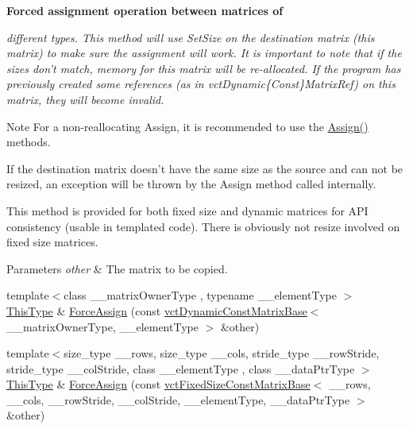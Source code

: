 \begin{Indent}{\bf Forced assignment operation between matrices of}\par
{\em different types. This method will use Set\-Size on the destination matrix (this matrix) to make sure the assignment will work. It is important to note that if the sizes don't match, memory for this matrix will be re-\/allocated. If the program has previously created some references (as in vct\-Dynamic\{Const\}Matrix\-Ref) on this matrix, they will become invalid.

\begin{DoxyNote}{Note}
For a non-\/reallocating Assign, it is recommended to use the \hyperlink{classvct_dynamic_matrix_base_a2f080a67dc52e906f0219bbc924febbc}{Assign()} methods.

If the destination matrix doesn't have the same size as the source and can not be resized, an exception will be thrown by the Assign method called internally.

This method is provided for both fixed size and dynamic matrices for A\-P\-I consistency (usable in templated code). There is obviously not resize involved on fixed size matrices.
\end{DoxyNote}

\begin{DoxyParams}{Parameters}
{\em other} & The matrix to be copied. \\
\hline
\end{DoxyParams}
}\begin{DoxyCompactItemize}
\item 
{\footnotesize template$<$class \-\_\-\-\_\-matrix\-Owner\-Type , typename \-\_\-\-\_\-element\-Type $>$ }\\\hyperlink{classvct_dynamic_const_matrix_base_ac4ff48cbe4d9de3fdef5a02447ffb9db}{This\-Type} \& \hyperlink{classvct_dynamic_matrix_base_ab29e3da9a500707dc89a48f1b85d8aec}{Force\-Assign} (const \hyperlink{classvct_dynamic_const_matrix_base}{vct\-Dynamic\-Const\-Matrix\-Base}$<$ \-\_\-\-\_\-matrix\-Owner\-Type, \-\_\-\-\_\-element\-Type $>$ \&other)
\item 
{\footnotesize template$<$size\-\_\-type \-\_\-\-\_\-rows, size\-\_\-type \-\_\-\-\_\-cols, stride\-\_\-type \-\_\-\-\_\-row\-Stride, stride\-\_\-type \-\_\-\-\_\-col\-Stride, class \-\_\-\-\_\-element\-Type , class \-\_\-\-\_\-data\-Ptr\-Type $>$ }\\\hyperlink{classvct_dynamic_const_matrix_base_ac4ff48cbe4d9de3fdef5a02447ffb9db}{This\-Type} \& \hyperlink{classvct_dynamic_matrix_base_aed7c5ada42a3f300ca14684df76cb6fc}{Force\-Assign} (const \hyperlink{classvct_fixed_size_const_matrix_base}{vct\-Fixed\-Size\-Const\-Matrix\-Base}$<$ \-\_\-\-\_\-rows, \-\_\-\-\_\-cols, \-\_\-\-\_\-row\-Stride, \-\_\-\-\_\-col\-Stride, \-\_\-\-\_\-element\-Type, \-\_\-\-\_\-data\-Ptr\-Type $>$ \&other)
\end{DoxyCompactItemize}
\end{Indent}
